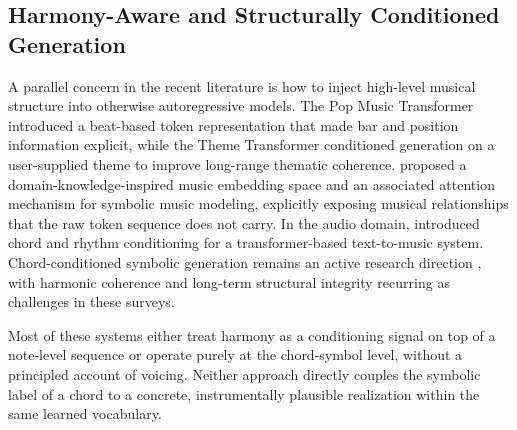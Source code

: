 \documentclass{aimc2026}
\begin{document}
\subsection{Harmony-Aware and Structurally Conditioned Generation}

A parallel concern in the recent literature is how to inject high-level musical structure into otherwise autoregressive models. The Pop Music Transformer \citep{huang2020pop} introduced a beat-based token representation that made bar and position information explicit, while the Theme Transformer \citep{shih2022theme} conditioned generation on a user-supplied theme to improve long-range thematic coherence. \citet{guo2022domain} proposed a domain-knowledge-inspired music embedding space and an associated attention mechanism for symbolic music modeling, explicitly exposing musical relationships that the raw token sequence does not carry. In the audio domain, \citet{lan2024musicongen} introduced chord and rhythm conditioning for a transformer-based text-to-music system. Chord-conditioned symbolic generation remains an active research direction \citep{le2025natural, ji2023survey}, with harmonic coherence and long-term structural integrity recurring as challenges in these surveys.

Most of these systems either treat harmony as a conditioning signal on top of a note-level sequence or operate purely at the chord-symbol level, without a principled account of voicing. Neither approach directly couples the symbolic label of a chord to a concrete, instrumentally plausible realization within the same learned vocabulary.
\end{document}
